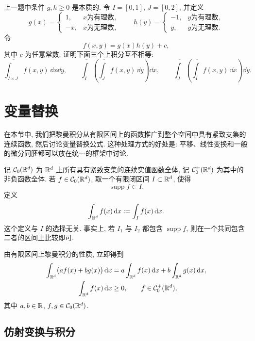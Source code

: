 \begin{exer}\label{exer:nonnegative-assumption-essential}
	上一题中条件 \(g,h\geq0\) 是本质的. 令 \(I=[0,1]\), \(J=[0,2]\), 并定义
	\[
	g(x)=
	\begin{cases}
		1, & x\text{为有理数},\\
		-x, & x\text{为无理数},
	\end{cases}
	\qquad
	h(y)=
	\begin{cases}
		-1, & y\text{为有理数},\\
		y, & y\text{为无理数}.
	\end{cases}
	\]
	令
	\[
	f(x,y)=g(x)h(y)+c,
	\]
	其中 \(c\) 为任意常数. 证明下面三个上积分互不相等:
	\[
	\overline{\int_{I\times J}} f(x,y)\,\dd x\dd y,
	\qquad
	\overline{\int_I}\left(\overline{\int_J}f(x,y)\,\dd y\right)\dd x,
	\qquad
	\overline{\int_J}\left(\overline{\int_I}f(x,y)\,\dd x\right)\dd y.
	\]
\end{exer}

\clearpage

\section{变量替换}
\label{sec:change-of-variables-riemann}

在本节中, 我们把黎曼积分从有限区间上的函数推广到整个空间中具有紧致支集的连续函数, 然后讨论变量替换公式. 这种处理方式的好处是: 平移、线性变换和一般的微分同胚都可以放在统一的框架中讨论.

记 \(\mathcal{C}_0(\mathbb{R}^d)\) 为 \(\mathbb{R}^d\) 上所有具有紧致支集的连续实值函数全体, 记 \(\mathcal{C}_0^+(\mathbb{R}^d)\) 为其中的非负函数全体. 若 \(f\in \mathcal{C}_0(\mathbb{R}^d)\), 取一个有限闭区间 \(I\subset\mathbb{R}^d\), 使得
\[
\operatorname{supp} f\subset I.
\]
定义
\[
\int_{\mathbb{R}^d}f(x)\,\dd x:=\int_I f(x)\,\dd x.
\]
这个定义与 \(I\) 的选择无关. 事实上, 若 \(I_1\) 与 \(I_2\) 都包含 \(\operatorname{supp} f\), 则在一个共同包含二者的区间上比较即可.

由有限区间上黎曼积分的性质, 立即得到
\begin{align}
	\int_{\mathbb{R}^d}\bigl(af(x)+bg(x)\bigr)\,\dd x
	&=a\int_{\mathbb{R}^d}f(x)\,\dd x
	+b\int_{\mathbb{R}^d}g(x)\,\dd x,
	\label{eq:c0-integral-linear}\\
	\int_{\mathbb{R}^d}f(x)\,\dd x&\geq 0,
	\qquad f\in\mathcal{C}_0^+(\mathbb{R}^d),
	\label{eq:c0-integral-positive}
\end{align}
其中 \(a,b\in\mathbb{R}\), \(f,g\in\mathcal{C}_0(\mathbb{R}^d)\).

\subsection{仿射变换与积分}

